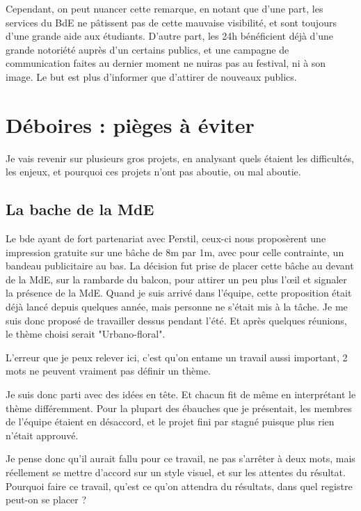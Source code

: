    Cependant, on peut nuancer cette remarque, en notant que d'une part, les services du BdE ne pâtissent pas de cette mauvaise visibilité, et sont toujours d'une grande aide aux étudiants. D'autre part, les 24h bénéficient déjà d'une grande notoriété auprès d'un certains publics, et une campagne de communication faites au dernier moment ne nuiras pas au festival, ni à son image. Le but est plus d'informer que d'attirer de nouveaux publics.
    
\section{Déboires : pièges à éviter}

    Je vais revenir sur plusieurs gros projets, en analysant quels étaient les difficultés, les enjeux, et pourquoi ces projets n'ont pas aboutie, ou mal aboutie.
    
    \subsection{La bache de la MdE}
    
        Le bde ayant de fort partenariat avec Perstil, ceux-ci nous proposèrent une impression gratuite sur une bâche de 8m par 1m, avec pour celle contrainte, un bandeau publicitaire au bas.
        La décision fut prise de placer cette bâche au devant de la MdE, sur la rambarde du balcon, pour attirer un peu plus l'œil et signaler la présence de la MdE.
        Quand je suis arrivé dans l'équipe, cette proposition était déjà lancé depuis quelques année, mais personne ne s'était mis à la tâche.
        Je me suis donc proposé de travailler dessus pendant l'été. Et après quelques réunions, le thème choisi serait "Urbano-floral".
        
        L'erreur que je peux relever ici, c'est qu'on entame un travail aussi important, 2 mots ne peuvent vraiment pas définir un thème.
        
        Je suis donc parti avec des idées en tête. Et chacun fit de même en interprétant le thème différemment.
        Pour la plupart des ébauches que je présentait, les membres de l'équipe étaient en désaccord, et le projet fini par stagné puisque plus rien n'était approuvé.
        
        Je pense donc qu'il aurait fallu pour ce travail, ne pas s'arrêter à deux mots, mais réellement se mettre d'accord sur un style visuel, et sur les attentes du résultat.
        Pourquoi faire ce travail, qu'est ce qu'on attendra du résultats, dans quel registre peut-on se placer ?
        
